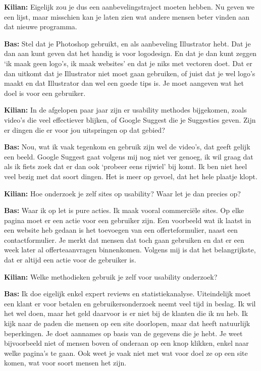 \textbf{Kilian:} Eigelijk zou je dus een aanbevelingstraject moeten hebben. Nu geven we een lijst, maar misschien kan je laten zien wat andere mensen beter vinden aan dat nieuwe programma.

\textbf{Bas:} Stel dat je Photoshop gebruikt, en als aanbeveling Illustrator hebt. Dat je dan aan kunt geven dat het handig is voor logodesign. En dat je dan kunt zeggen `ik maak geen logo's, ik maak websites' en dat je niks met vectoren doet. Dat er dan uitkomt dat je Illustrator niet moet gaan gebruiken, of juist dat je wel logo's maakt en dat Illustrator dan wel een goede tips is. Je moet aangeven wat het doel is voor een gebruiker.

\textbf{Kilian:} In de afgelopen paar jaar zijn er usability methodes bijgekomen, zoals video's die veel effectiever blijken, of Google Suggest die je Suggesties geven. Zijn er dingen die er voor jou uitspringen op dat gebied?

\textbf{Bas:} Nou, wat ik vaak tegenkom en gebruik zijn wel de video's, dat geeft gelijk een beeld. Google Suggest gaat volgens mij nog niet ver genoeg, ik wil graag dat als ik fiets zoek dat er dan ook `probeer eens rijwiel' bij komt. Ik ben niet heel veel bezig met dat soort dingen. Het is meer op gevoel, dat het hele plaatje klopt.

\textbf{Kilian:} Hoe onderzoek je zelf sites op usability? Waar let je dan precies op?

\textbf{Bas:} Waar ik op let is pure acties. Ik maak vooral commerci\"ele sites. Op elke pagina moet er een actie voor een gebruiker zijn. Een voorbeeld wat ik laatst in een website heb gedaan is het toevoegen van een offerteformulier, naast een contactformulier. Je merkt dat mensen dat toch gaan gebruiken en dat er een week later al offerteaanvragen binnenkomen. Volgens mij is dat het belangrijkste, dat er altijd een actie voor de gebruiker is.

\textbf{Kilian:} Welke methodieken gebruik je zelf voor usability onderzoek?

\textbf{Bas:} Ik doe eigelijk enkel expert reviews en statistiekanalyse. Uiteindelijk moet een klant er voor betalen en gebruikersonderzoek neemt veel tijd in beslag. Ik wil het wel doen, maar het geld daarvoor is er niet bij de klanten die ik nu heb. Ik kijk naar de paden die mensen op een site doorlopen, maar dat heeft natuurlijk beperkingen. Je doet aannames op basis van de gegevens die je hebt. Je weet bijvoorbeeld niet of mensen boven of onderaan op een knop klikken, enkel naar welke pagina's te gaan. Ook weet je vaak niet met wat voor doel ze op een site komen, wat voor soort mensen het zijn.

